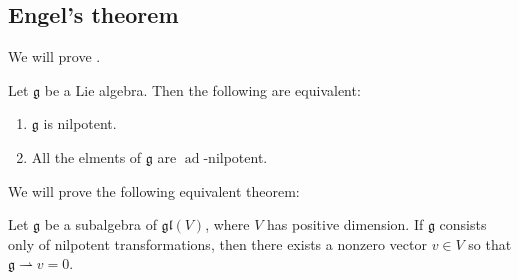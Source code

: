 \documentclass{article}
\DeclareMathOperator{\ad}{ad}
\newcommand*\frkg{{\ensuremath{\mathfrak{g}}}}
\newcommand*\glalg{\ensuremath{\mathfrak{gl}}}
\begin{document}
\subsection{Engel's theorem}

We will prove .

\begin{theorem}[Engel]
    Let $\frkg$ be a Lie algebra.
    Then the following are equivalent:
    \begin{enumerate}[label=(\roman*)]
        \item 
            $\frkg$ is nilpotent.
        \item 
            All the elments of $\frkg$ are $\ad$-nilpotent.
    \end{enumerate}
\end{theorem}

We will prove the following equivalent theorem:

\begin{theorem}
    Let $\frkg$ be a subalgebra of $\glalg(V)$, where $V$ has positive dimension.
    If $\frkg$ consists only of nilpotent transformations, then there exists a nonzero vector $v \in V$ so that $\frkg \rightharpoonup v = 0$.
\end{theorem}
\end{document}
